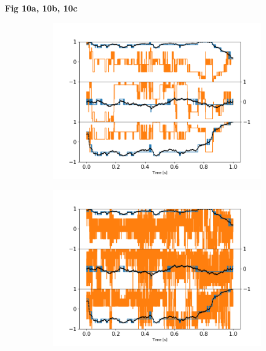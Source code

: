 \documentclass[final,  3p]{elsarticle}
\begin{document}
\begin{center}
	\bf{Fig 10a, 10b, 10c}
\end{center}
\begin{figure}[h]
	\centering
	\begin{subfigure}{0.32\textwidth}
		\subcaption{}
		\includegraphics[width=\textwidth]{./Images/fig10a.png}
	\end{subfigure}
	\begin{subfigure}{0.32\textwidth}
		\subcaption{}
		\includegraphics[width=\textwidth]{./Images/fig10b.png}
	\end{subfigure}
	\begin{subfigure}{0.32\textwidth}
		\subcaption{}

\end{subfigure}
\end{figure}
\end{document}

